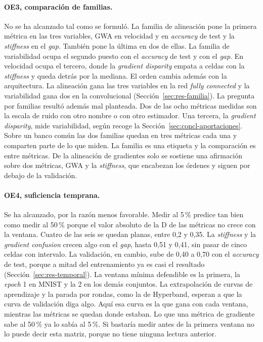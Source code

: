 \paragraph{OE3, comparación de familias.} No se ha alcanzado tal como se formuló. La familia de alineación pone la primera métrica en las tres variables, GWA en velocidad y en \emph{accuracy} de test y la \emph{stiffness} en el \emph{gap}. También pone la última en dos de ellas. La familia de variabilidad ocupa el segundo puesto con el \emph{accuracy} de test y con el \emph{gap}. En velocidad ocupa el tercero, donde la \emph{gradient disparity} empata a celdas con la \emph{stiffness} y queda detrás por la mediana. El orden cambia además con la arquitectura. La alineación gana las tres variables en la red \emph{fully connected} y la variabilidad gana dos en la convolucional (Sección~\ref{sec:res-familia}). La pregunta por familias resultó además mal planteada. Dos de las ocho métricas medidas son la escala de ruido con otro nombre o con otro estimador. Una tercera, la \emph{gradient disparity}, mide variabilidad, según recoge la Sección~\ref{sec:concl-aportaciones}. Sobre un banco común las dos familias quedan en tres métricas cada una y comparten parte de lo que miden. La familia es una etiqueta y la comparación es entre métricas. De la alineación de gradientes solo se sostiene una afirmación sobre dos métricas, GWA y la \emph{stiffness}, que encabezan los órdenes y siguen por debajo de la validación.

\paragraph{OE4, suficiencia temprana.} Se ha alcanzado, por la razón menos favorable. Medir al 5\,\% predice tan bien como medir al 50\,\% porque el valor absoluto de la D de las métricas no crece con la ventana. Cuatro de las seis se quedan planas, entre 0,2 y 0,35. La \emph{stiffness} y la \emph{gradient confusion} crecen algo con el \emph{gap}, hasta 0,51 y 0,41, sin pasar de cinco celdas con intervalo. La validación, en cambio, sube de 0,40 a 0,70 con el \emph{accuracy} de test, porque a mitad del entrenamiento ya es casi el resultado (Sección~\ref{sec:res-temporal}). La ventana mínima defendible es la primera, la \emph{epoch} 1 en MNIST y la 2 en los demás conjuntos. La extrapolación de curvas de aprendizaje y la parada por rondas, como la de Hyperband, esperan a que la curva de validación diga algo. Aquí esa curva es la que gana con cada ventana, mientras las métricas se quedan donde estaban. Lo que una métrica de gradiente sabe al 50\,\% ya lo sabía al 5\,\%. Si bastaría medir antes de la primera ventana no lo puede decir esta matriz, porque no tiene ninguna lectura anterior.

